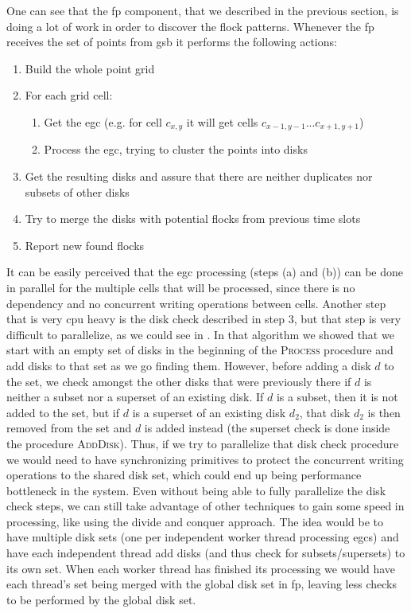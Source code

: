 One can see that the \ac{fp} component, that we described in the previous section, is doing a lot of work in order to
discover the flock patterns. Whenever the \ac{fp} receives the set of points from \ac{gsb} it performs the following
actions:

\begin{enumerate}
    \item Build the whole point grid
    \item For each grid cell:
    \begin{enumerate}
        \item Get the \ac{egc} (e.g. for cell $c_{x,y}$ it will get cells $c_{x - 1, y - 1}...c_{x + 1, y+ 1}$)
        \item Process the \ac{egc}, trying to cluster the points into disks
    \end{enumerate}
    \item Get the resulting disks and assure that there are neither duplicates nor subsets of other disks
    \item Try to merge the disks with potential flocks from previous time slots
    \item Report new found flocks
\end{enumerate}

It can be easily perceived that the \ac{egc} processing (steps (a) and (b)) can be done in parallel for the multiple
cells that will be processed, since there is no dependency and no concurrent writing operations between cells. Another
step that is very \ac{cpu} heavy is the disk check described in step 3, but that step is very difficult to parallelize,
as we could see in . In that algorithm we showed that we start with an empty set of disks in the
beginning of the \textsc{Process} procedure and add disks to that set as we go finding them. However, before adding a
disk $d$ to the set, we check amongst the other disks that were previously there if $d$ is neither a subset nor a
superset of an existing disk. If $d$ is a subset, then it is not added to the set, but if $d$ is a superset of an
existing disk $d_2$, that disk $d_2$ is then removed from the set and $d$ is added instead (the superset check is done
inside the procedure \textsc{AddDisk}). Thus, if we try to parallelize that disk check procedure we would need to have
synchronizing primitives to protect the concurrent writing operations to the shared disk set, which could end up being
performance bottleneck in the system. Even without being able to fully parallelize the disk check steps, we can still
take advantage of other techniques to gain some speed in processing, like using the divide and conquer approach. The
idea would be to have multiple disk sets (one per independent worker thread processing \acp{egc}) and have each
independent thread add disks (and thus check for subsets/supersets) to its own set. When each worker thread has finished
its processing we would have each thread's set being merged with the global disk set in \ac{fp}, leaving less checks to
be performed by the global disk set.

